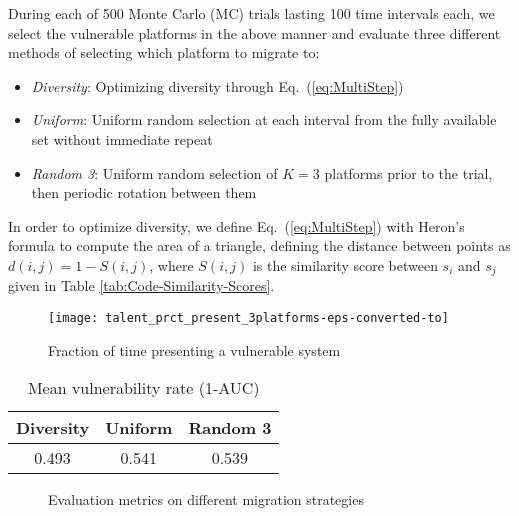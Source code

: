 \documentclass{acm_proc_article-sp}
\providecommand{\tabularnewline}{\\}
\begin{document}
During each of 500 Monte Carlo (MC) trials lasting 100 time intervals each, we select the vulnerable platforms in the above manner and evaluate three different methods of selecting which platform to migrate to:
\begin{itemize}
\item \emph{Diversity}: Optimizing diversity through Eq.\ (\ref{eq:MultiStep})
\item \emph{Uniform}: Uniform random selection at each interval from the fully available set without immediate repeat
\item \emph{Random 3}: Uniform random selection of $K=3$ platforms prior to the trial, then periodic rotation between them
\end{itemize}
In order to optimize diversity, we define Eq.\ (\ref{eq:MultiStep}) with Heron's formula to compute the area of a triangle, defining the distance between points as $d(i,j)=1-S(i,j)$, where $S(i,j)$ is the similarity score between $s_{i}$ and $s_{j}$ given in Table \ref{tab:Code-Similarity-Scores}.

\begin{figure}
\begin{centering}
\texttt{[image: talent\_prct\_present\_3platforms-eps-converted-to]}
\par\end{centering}
\caption{Fraction of time presenting a vulnerable system\label{fig:Percentage-Vulnerable}}
\end{figure}

\begin{table}[t]
\begin{centering}
\begin{tabular}{|c|c|c|}
\hline 
Diversity & Uniform & Random 3\tabularnewline
\hline 
\hline 
0.493 & 0.541 & 0.539\tabularnewline
\hline 
\end{tabular}
\par\end{centering}
\caption{Mean vulnerability rate (1-AUC)\label{tab:Mean-vulnerability-rate}}
\end{table}

\begin{figure*}[t]
\centering
{}
\caption{Evaluation metrics on different migration strategies\label{fig:Evaluation-metrics-Sim}}
\end{figure*}
\end{document}
